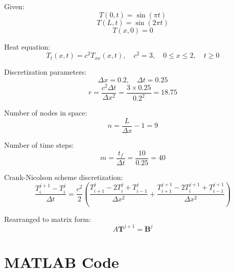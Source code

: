 \documentclass{article}
\begin{document}
Given:
\[
T(0,t) = \sin(\pi t)
\]
\[
T(L,t) = \sin(2\pi t)
\]
\[
T(x,0) = 0
\]

Heat equation:
\[
T_t(x,t) = c^2 T_{xx}(x,t), \quad c^2 = 3, \quad 0 \leq x \leq 2, \quad t \geq 0
\]

Discretization parameters:
\[
\Delta x = 0.2, \quad \Delta t = 0.25
\]
\[
r = \frac{c^2 \Delta t}{\Delta x^2} = \frac{3 \times 0.25}{0.2^2} = 18.75
\]

Number of nodes in space:
\[
n = \frac{L}{\Delta x} - 1 = 9
\]

Number of time steps:
\[
m = \frac{t_f}{\Delta t} = \frac{10}{0.25} = 40
\]

Crank-Nicolson scheme discretization:
\[
\frac{T_i^{j+1} - T_i^j}{\Delta t} = \frac{c^2}{2} \left( \frac{T_{i+1}^j - 2T_i^j + T_{i-1}^j}{\Delta x^2} + \frac{T_{i+1}^{j+1} - 2T_i^{j+1} + T_{i-1}^{j+1}}{\Delta x^2} \right)
\]

Rearranged to matrix form:
\[
A \mathbf{T}^{j+1} = \mathbf{B}^j
\]

\section*{MATLAB Code}

\end{document}
